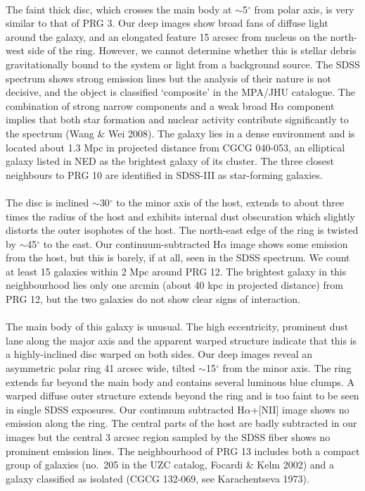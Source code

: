 \documentclass[useAMS,usenatbib]{mn2e}
\begin{document}
 \\
The faint thick disc, which crosses the main body at $\sim$5$^\circ$ from polar axis, is very similar to that of PRG 3. 
Our deep images show broad fans of diffuse light around the galaxy, and an elongated feature 15 arcsec from nucleus on the north-west side of the ring. However, we cannot determine whether this is stellar debris gravitationally bound to the system or light from a background source.
The SDSS spectrum shows strong emission lines but the analysis of their nature is not decisive, and the object is classified `composite' in the MPA/JHU catalogue. The combination of strong narrow components and a weak broad H$\alpha$ component implies that both star formation and nuclear activity contribute significantly to the spectrum (Wang \& Wei 2008).
The galaxy lies in a dense environment and is located about 1.3 Mpc in projected distance from CGCG 040-053, an elliptical galaxy listed in NED as the brightest galaxy of its cluster. The three closest neighbours to PRG 10 are identified in SDSS-III as star-forming galaxies. \\

\\ 
The disc is inclined $\sim$30$^\circ$ to the minor axis of the host, extends to about three times the radius of the host and exhibits internal dust obscuration which slightly distorts the outer isophotes of the host. 
The north-east edge of the ring is twisted by $\sim$45$^\circ$ to the east.
Our continuum-subtracted H$\alpha$ image shows some emission from the host, but this is barely, if at all, seen in the SDSS spectrum. 
We count at least 15 galaxies within 2 Mpc around PRG 12. 
The brightest galaxy in this neighbourhood lies only one arcmin (about 40 kpc in projected distance) from PRG 12, but the two galaxies do not show clear signs of interaction. \\

 \\
The main body of this galaxy is unusual. The high eccentricity, prominent dust lane along the major axis and the apparent warped structure indicate that this is a highly-inclined disc warped on both sides.
Our deep images reveal an asymmetric polar ring 41 arcsec wide, tilted $\sim$15$^\circ$ from the minor axis.
The ring extends far beyond the main body and contains several luminous blue clumps. 
A warped diffuse outer structure extends beyond the ring and is too faint to be seen in single SDSS exposures.
Our continuum subtracted H$\alpha$+[NII] image shows no emission along the ring. The central parts of the host are badly subtracted in our images but the central 3 arcsec region sampled by the SDSS fiber shows no prominent emission lines.
The neighbourhood of PRG 13 includes both a compact group of galaxies (no.\ 205 in the UZC catalog, Focardi \& Kelm 2002) and a galaxy classified as isolated (CGCG 132-069, see Karachentseva 1973). \\
\end{document}
